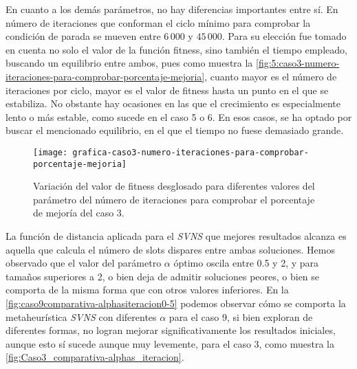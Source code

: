
En cuanto a los demás parámetros, no hay diferencias importantes entre sí. En número de iteraciones que conforman el ciclo mínimo para comprobar la condición de parada se mueven entre $6\,000$ y $45\,000$. Para su elección fue tomado en cuenta no solo el valor de la función fitness, sino también el tiempo empleado, buscando un equilibrio entre ambos, pues como muestra la \autoref{fig:5:caso3-numero-iteraciones-para-comprobar-porcentaje-mejoria}, cuanto mayor es el número de iteraciones por ciclo, mayor es el valor de fitness hasta un punto en el que se estabiliza. No obstante hay ocasiones en las que el crecimiento es especialmente lento o más estable, como sucede en el caso 5 o 6. En esos casos, se ha optado por buscar el mencionado equilibrio, en el que el tiempo no fuese demasiado grande.

\begin{figure}
	\centering
	\texttt{[image: grafica-caso3-numero-iteraciones-para-comprobar-porcentaje-mejoria]}
	\caption{Variación del valor de fitness desglosado para diferentes valores del parámetro del número de iteraciones para comprobar el porcentaje de mejoría del caso 3.}
	\label{fig:5:caso3-numero-iteraciones-para-comprobar-porcentaje-mejoria}
\end{figure}



La función de distancia aplicada para el \textit{SVNS} que mejores resultados alcanza es aquella que calcula el número de slots dispares entre ambas soluciones. Hemos observado que el valor del parámetro $\alpha$ óptimo oscila entre 0.5 y 2, y para tamaños superiores a 2, o bien deja de admitir soluciones peores, o bien se comporta de la misma forma que con otros valores inferiores. En la \autoref{fig:caso9comparativa-alphasiteracion0-5} podemos observar cómo se comporta la metaheurística \textit{SVNS} con diferentes $\alpha$ para el caso 9, si bien exploran de diferentes formas, no logran mejorar significativamente los resultados iniciales, aunque esto sí sucede aunque muy levemente, para el caso 3, como muestra la \autoref{fig:Caso3_comparativa-alphas_iteracion}.

